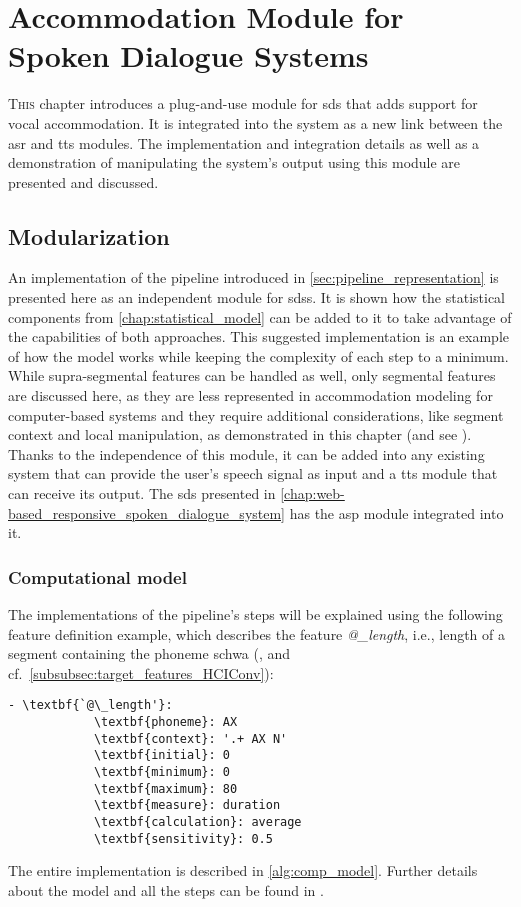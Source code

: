 \chapter[Accommodation Module for Spoken Dialogue Systems]{Accommodation Module for\\Spoken Dialogue Systems}
\label{chap:convergence_module_for_sdss}

\lettrine{T}{his} chapter introduces a plug-and-use module for \acs{sds} that adds support for vocal accommodation.
It is integrated into the system as a new link between the \acs{asr} and \acs{tts} modules.
The implementation and integration details as well as a demonstration of manipulating the system's output using this module are presented and discussed.

\pagebreak

\section{Modularization}
\label{sec:modularization}

An implementation of the pipeline introduced in \cref{sec:pipeline_representation} is presented here as an independent module for \acp{sds}.
It is shown how the statistical components from \cref{chap:statistical_model} can be added to it to take advantage of the capabilities of both approaches.
This suggested implementation is an example of how the model works while keeping the complexity of each step to a minimum.
While supra-segmental features can be handled as well, only segmental features are discussed here, as they are less represented in accommodation modeling for computer-based systems and they require additional considerations, like segment context and local manipulation, as demonstrated in this chapter (and see \citet{Raveh2017SemDial}).
Thanks to the independence of this module, it can be added into any existing system that can provide the user's speech signal as input and a \ac{tts} module that can receive its output.
The \ac{sds} presented in \cref{chap:web-based_responsive_spoken_dialogue_system} has the \ac{asp} module integrated into it.

\subsection{Computational model}
\label{subsec:computational_model}

The implementations of the pipeline's steps will be explained using the following feature definition example, which describes the feature \emph{@\_length}, i.e., length of a segment containing the phoneme schwa (\textipa{[@]}, and cf.\ \cref{subsubsec:target_features_HCIConv}):
%
\begin{Verbatim}[tabsize=4, commandchars=\\\{\}]
	- \textbf{`@\_length'}:
			\textbf{phoneme}: AX
			\textbf{context}: '.+ AX N'
			\textbf{initial}: 0
			\textbf{minimum}: 0 
			\textbf{maximum}: 80
			\textbf{measure}: duration
			\textbf{calculation}: average
			\textbf{sensitivity}: 0.5
\end{Verbatim}
%
The entire implementation is described in \cref{alg:comp_model}.
Further details about the model and all the steps can be found in \citet{Raveh2017Interspeech}.

